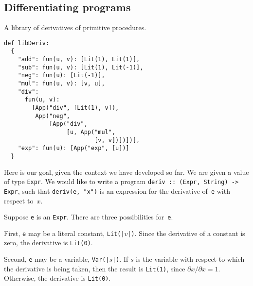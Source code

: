 \documentclass[11pt, a4paper]{article}
\newcommand{\cd}[1]{\texttt{#1}}
\begin{document}
\subsection{Differentiating programs}

\begin{marginfigure}
  \caption{A library of derivatives of primitive
    procedures.\label{fig:deriv-library}}
  \footnotesize
\begin{verbatim}
def libDeriv:
  {
    "add": fun(u, v): [Lit(1), Lit(1)],
    "sub": fun(u, v): [Lit(1), Lit(-1)],
    "neg": fun(u): [Lit(-1)],
    "mul": fun(u, v): [v, u],
    "div": 
      fun(u, v):
        [App("div", [Lit(1), v]),
         App("neg",
             [App("div",
                  [u, App("mul",
                          [v, v])])])],
    "exp": fun(u): [App("exp", [u])]
  }
\end{verbatim}
\end{marginfigure}
Here is our goal, given the context we have developed so far. We are
given a value of type \cd{Expr}. We would like to write a program
\cd{deriv :: (Expr, String) -> Expr}, such that \cd{deriv(e, "x")} is an expression
for the derivative of~\cd{e} with respect to~$x$.

Suppose \cd{e} is an \cd{Expr}. There are three possibilities
for~\cd{e}.

First, \cd{e} may be a literal constant, \cd{Lit(|$v$|)}. Since the
derivative of a constant is zero, the derivative is \cd{Lit(0)}.

Second, \cd{e} may be a variable, \cd{Var(|$s$|)}. If $s$ is the
variable with respect to which the derivative is being taken, then the
result is \cd{Lit(1)}, since $\partial x/\partial x = 1$. Otherwise, the derivative
is \cd{Lit(0)}.
\end{document}
